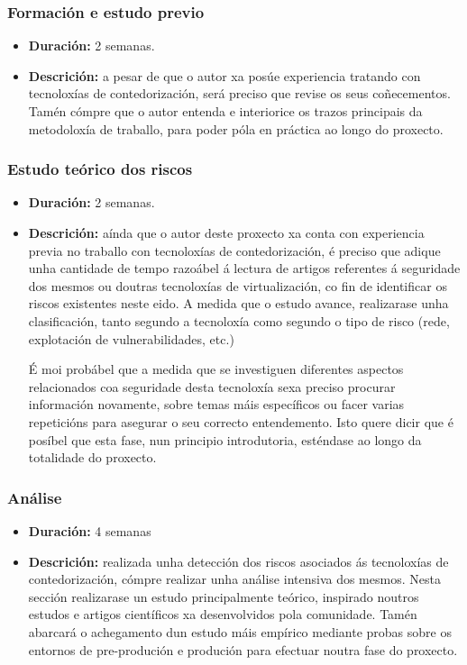 \subsubsection{Formación e estudo previo}

\begin{itemize}
    \item \textbf{Duración:} 2 semanas.
    \item \textbf{Descrición:} a pesar de que o autor xa posúe experiencia tratando con tecnoloxías de contedorización, será preciso que revise os seus coñecementos. Tamén cómpre que o autor entenda e interiorice os trazos principais da metodoloxía de traballo, para poder póla en práctica ao longo do proxecto.
\end{itemize}

\subsubsection{Estudo teórico dos riscos}

\begin{itemize}
    \item \textbf{Duración:} 2 semanas.
    \item \textbf{Descrición:} aínda que o autor deste proxecto xa conta con experiencia previa no traballo con tecnoloxías de contedorización, é preciso que adique unha cantidade de tempo razoábel á lectura de artigos referentes á seguridade dos mesmos ou doutras tecnoloxías de virtualización, co fin de identificar os riscos existentes neste eido. A medida que o estudo avance, realizarase unha clasificación, tanto segundo a tecnoloxía como segundo o tipo de risco (rede, explotación de vulnerabilidades, etc.)
    
    É moi probábel que a medida que se investiguen diferentes aspectos relacionados coa seguridade desta tecnoloxía sexa preciso procurar información novamente, sobre temas máis específicos ou facer varias repeticións para asegurar o seu correcto entendemento. Isto quere dicir que é posíbel que esta fase, nun principio introdutoria, esténdase ao longo da totalidade do proxecto.
\end{itemize}

\subsubsection{Análise}

\begin{itemize}
    \item \textbf{Duración:} 4 semanas
    \item \textbf{Descrición:} realizada unha detección dos riscos asociados ás tecnoloxías de contedorización, cómpre realizar unha análise intensiva dos mesmos. Nesta sección realizarase un estudo principalmente teórico, inspirado noutros estudos e artigos científicos xa desenvolvidos pola comunidade. Tamén abarcará o achegamento dun estudo máis empírico mediante probas sobre os entornos de pre-produción e produción para efectuar noutra fase do proxecto.
\end{itemize}

